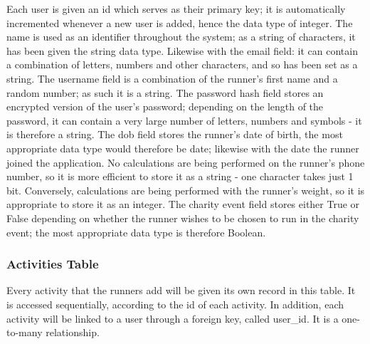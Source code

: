 \documentclass{article}[12pt,a4paper]
\begin{document}
Each user is given an id which serves as their primary key; it is automatically incremented whenever a new user is added, hence the data type of integer. The name is used as an identifier throughout the system; as a string of characters, it has been given the string data type. Likewise with the email field: it can contain a combination of letters, numbers and other characters, and so has been set as a string. The username field is a combination of the runner's first name and a random number; as such it is a string. The password hash field stores an encrypted version of the user's password; depending on the length of the password, it can contain a very large number of letters, numbers and symbols - it is therefore a string. The dob field stores the runner's date of birth, the most appropriate data type would therefore be date; likewise with the date the runner joined the application. No calculations are being performed on the runner's phone number, so it is more efficient to store it as a string - one character takes just 1 bit. Conversely, calculations are being performed with the runner's weight, so it is appropriate to store it as an integer. The charity event field stores either True or False depending on whether the runner wishes to be chosen to run in the charity event; the most appropriate data type is therefore Boolean.

\subsubsection{Activities Table}

Every activity that the runners add will be given its own record in this table. It is accessed sequentially, according to the id of each activity. In addition, each activity will be linked to a user through a foreign key, called user\_id. It is a one-to-many relationship.
\end{document}
